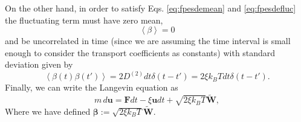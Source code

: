 \documentclass[twoside,openright,titlepage,numbers=noenddot,%
headinclude,footinclude,cleardoublepage=empty,abstract=on,
BCOR=5mm,fontsize=11pt, dvipsnames, paper=b5
]{scrreprt}
\renewcommand{\vec}[1]{\bm{#1}}
\newcommand{\kT}{k_B T}
\newcommand{\noise}{\widetilde{W}}
\newcommand{\pvel}{u}
\begin{document}
On the other hand, in order to satisfy Eqs. \eqref{eq:fpesdemean} and \eqref{eq:fpesdefluc} the fluctuating term must have zero mean,
\begin{equation}
  \label{eq:noisemean}
  \left\langle\beta\right\rangle = 0
\end{equation}
and be uncorrelated in time (since we are assuming the time interval is small enough to consider the transport coefficients as constants) with standard deviation given by
\begin{equation}
  \label{eq:noiseautocorr}
  \left\langle\beta(t)\beta(t')\right\rangle = 2D^{(2)}dt\delta(t-t') = 2\xi\kT dt\delta(t-t').
\end{equation}
Finally, we can write the Langevin equation as
\begin{equation}
  \label{eq:langevinfull}
  m\, d\vec{\pvel} = \vec{F}dt - \xi\vec{\pvel}dt +  \sqrt{2\xi\kT}\vec{\noise},
\end{equation}
Where we have defined $\vec{\beta} := \sqrt{2\xi\kT}\vec{\noise}$.
\end{document}
